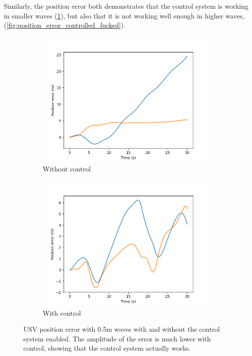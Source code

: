 \documentclass[class=article, crop=false]{standalone}
\begin{document}
Similarly, the position error both demonstrates that the control system is working in smaller waves (\cref{fig:position_error_controlled}), but also that it is not working well enough in higher waves, (\cref{fig:position_error_controlled_fucked}).

\begin{figure}
    \centering
    \begin{subfigure}{0.45\textwidth}
        \centering
        \includegraphics{scenario1/rov-50m/0.5m/usv_pos_error_uncontrolled}
        \caption{Without control}
    \end{subfigure}
    \hfill
    \begin{subfigure}{0.45\textwidth}
        \centering
        \includegraphics{scenario1/rov-50m/0.5m/usv_pos_error_controlled}
        \caption{With control}
    \end{subfigure}
    \caption{USV position error with 0.5m waves with and without the control system enabled. The amplitude of the error is much lower with control, showing that the control system actually works.}
    \label{fig:position_error_controlled}
\end{figure}
\end{document}
